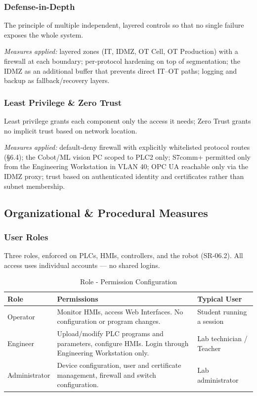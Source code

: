 \documentclass[11pt,a4paper]{article}
\renewcommand{\arraystretch}{1.15}
\begin{document}
\subsubsection{Defense-in-Depth}
The principle of multiple independent, layered controls so that no single
failure exposes the whole system.

\textit{Measures applied:} layered zones (IT, IDMZ, OT Cell, OT Production)
with a firewall at each boundary; per-protocol hardening on top of
segmentation; the IDMZ as an additional buffer that prevents direct IT--OT
paths; logging and backup as fallback/recovery layers.

\subsubsection{Least Privilege \& Zero Trust}
Least privilege grants each component only the access it needs; Zero Trust
grants no implicit trust based on network location.

\textit{Measures applied:} default-deny firewall with explicitly whitelisted
protocol routes (\S6.4); the Cobot/ML vision PC scoped to PLC2 only; S7comm+
permitted only from the Engineering Workstation in VLAN 40; OPC UA reachable
only via the IDMZ proxy; trust based on authenticated identity and certificates
rather than subnet membership.

\subsection{Organizational \& Procedural Measures}

\subsubsection{User Roles}
Three roles, enforced on PLCs, HMIs, controllers, and the robot (SR-06.2). All access uses individual accounts — no shared logins. \\
\begin{table}[htbp]
\renewcommand{\arraystretch}{1.3} %
\begin{tabularx}{\textwidth}{p{2.5cm} X X}
    \textbf{Role} & \textbf{Permissions} & \textbf{Typical User} \vspace{0.5em}\\
\toprule
    Operator & Monitor HMIs, access Web Interfaces. No configuration or program changes. & Student running a session \\
    \midrule
    Engineer & Upload/modify PLC programs and parameters, configure HMIs. Login through Engineering Workstation only. & Lab technician / Teacher \\
    \midrule
    Administrator &  Device configuration, user and certificate management, firewall and switch configuration. &  Lab administrator \\
    \bottomrule
\end{tabularx}
\vspace{1em}
    \caption{Role - Permission Configuration}
\end{table}
\end{document}
